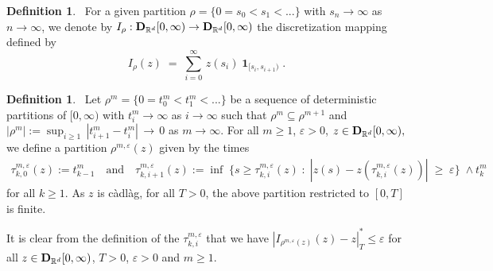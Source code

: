 \documentclass[11pt]{article}
\theoremstyle{definition}\newtheorem{example}[theorem]{Example}
\theoremstyle{definition}\newtheorem{counterexample}[theorem]{Counterexample}
\theoremstyle{definition}\newtheorem{remark}[theorem]{Remark}
\theoremstyle{definition}\newtheorem{defi}[theorem]{Definition}
\numberwithin{equation}{section}
\newcommand{\R}{\mathbb{R}}
\newcommand{\D}{{\bf D}}											%
\newcommand{\ind}{\operatorname{\mathbf{1}}}							%
\renewcommand{\inf}[1]{\underset{#1}{\operatorname{inf}}\;}					%
\renewcommand{\|}{\; : \, \;}											%
\begin{document}
\begin{defi}\ \label{def:3.20} 
	For a given partition $\rho=\{0=s_0<s_1<...\}$ with $s_n \to \infty$ as $n\to \infty$, we denote by $I_{\rho}: \D_{\R^d}[0, \infty) \to \D_{\R^d}[0,\infty)$ the discretization mapping defined by 
	$$ I_\rho(z) \; = \; \sum_{i=0}^{\infty} \, z(s_i) \ind_{[s_i,s_{i+1})}.$$
\end{defi}

\begin{defi}\ \label{def:3.21}
	Let $\rho^m=\{0=t^m_0< t^m_1 < ...\}$ be a sequence of deterministic partitions of $[0,\infty)$ with $t^m_i\to \infty$ as $i\to \infty$ such that $\rho^m \subseteq \rho^{m+1}$ and $|\rho^m|:= \operatorname{sup}_{i\ge 1} \,  |t^m_{i+1}-t^m_i| \, \to \, 0$ as $m\to \infty$. For all $m\ge 1$, $\varepsilon>0$, $z \in \D_{\R^d}[0,\infty),$ we define a partition $\rho^{m,\varepsilon}(z)$ given by the times  
	\begin{align*}
		\tau^{m,\varepsilon}_{k,0}(z)  :=  t_{k-1}^m \quad \text{and} \quad 
		\tau^{m,\varepsilon}_{k,i+1}(z)  := \inf{} \{ s \ge \tau^{m,\varepsilon}_{k,i}(z) \; : \; |z(s) - z(\tau^{m,\varepsilon}_{k,i}(z))| \; \ge \; \varepsilon \} \; \wedge t_k^m
	\end{align*}
	for all $k\ge 1$. As $z$ is càdlàg, for all $T>0$, the above partition restricted to $[0,T]$ is finite.
\end{defi}

It is clear from the definition of the $\tau^{m,\varepsilon}_{k,i}$ that we have $|I_{\rho^{m,\varepsilon}(z)}(z) - z |^*_T \le \varepsilon$
for all $z \in \D_{\R^d}[0,\infty)$, $T>0$, $\varepsilon>0$ and $m\ge 1$.
\end{document}
